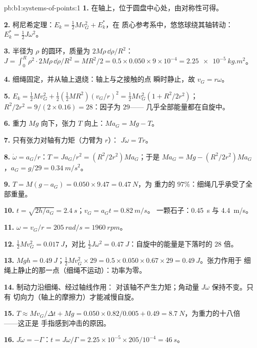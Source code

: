 \begin{solution}{pb:b1:systems-of-points:1}
\textbf{1.} 在轴上，位于圆盘中心处，由对称性可得。

\textbf{2.} 柯尼希定理：$E_k = \tfrac12 Mv_G^2 + E_k^*$，在
质心参考系中，悠悠球绕其轴转动：$E_k^* = \tfrac12 J\omega^2$。

\textbf{3.} 半径为 $\rho$ 的圆环，质量为 $2M\rho\,\dd\rho/R^2$：$J = \int_0^R
\rho^2\cdot 2M\rho\,\dd\rho/R^2 = MR^2/2 = 0.5 \times 0.050 \times 9\times10^{-4}
= \qty{2.25e-5}{kg.m^2}$。

\textbf{4.} 细绳固定，并从轴上退绕：轴上与之接触的点
瞬时静止，故 $v_G = r\omega$。

\textbf{5.} $E_k = \tfrac12 Mv_G^2 + \tfrac12(\tfrac12 MR^2)(v_G/r)^2 = \tfrac12
Mv_G^2(1 + R^2/2r^2)$；$R^2/2r^2 = 9/(2 \times 0.16) = 28$：因子为 $29$——
几乎全部能量都在自旋中。

\textbf{6.} 重力 $Mg$ 向下，张力 $T$ 向上：$Ma_G = Mg - T$。

\textbf{7.} 只有张力对轴有力矩（力臂为 $r$）：
$J\dot\omega = Tr$。

\textbf{8.} $\dot\omega = a_G/r$：$T = Ja_G/r^2 = (R^2/2r^2)Ma_G$；于是
$Ma_G = Mg - (R^2/2r^2)Ma_G$，$a_G = g/29 = \qty{0.34}{m/s^2}$。

\textbf{9.} $T = M(g - a_G) = 0.050 \times 9.47 = \qty{0.47}{N}$，为
重力的 $97\%$：细绳几乎承受了全部重量。

\textbf{10.} $t = \sqrt{2h/a_G} = \qty{2.4}{s}$；$v_G = a_Gt = \qty{0.82}{m/s}$。
一颗石子：\qty{0.45}{s} 与 \qty{4.4}{m/s}。

\textbf{11.} $\omega = v_G/r = \qty{205}{rad/s} = \qty{1960}{rpm}$。

\textbf{12.} $\tfrac12 Mv_G^2 = \qty{0.017}{J}$，对比 $\tfrac12 J\omega^2 =
\qty{0.47}{J}$：自旋中的能量是下落时的 $28$ 倍。

\textbf{13.} $Mgh = \qty{0.49}{J}$；$\tfrac12 Mv_G^2 \times 29 = 0.5 \times 0.050
\times 0.67 \times 29 = \qty{0.49}{J}$。张力作用于
细绳上静止的那一点（细绳不运动）：功率为零。

\textbf{14.} 制动力沿细绳、经过轴线作用：
对该轴不产生力矩；角动量 $J\omega$ 保持不变。只有
切向力（轴上的摩擦力）才能减慢自旋。

\textbf{15.} $T \approx Mv_G/\Delta t + Mg = 0.050 \times 0.82/0.005 + 0.49 =
\qty{8.7}{N}$，为重力的十八倍——这正是
手指感到冲击的原因。

\textbf{16.} $J\dot\omega = -\Gamma$：$t = J\omega/\Gamma = 2.25\times10^{-5} \times
205/10^{-4} = \qty{46}{s}$。


\end{solution}
